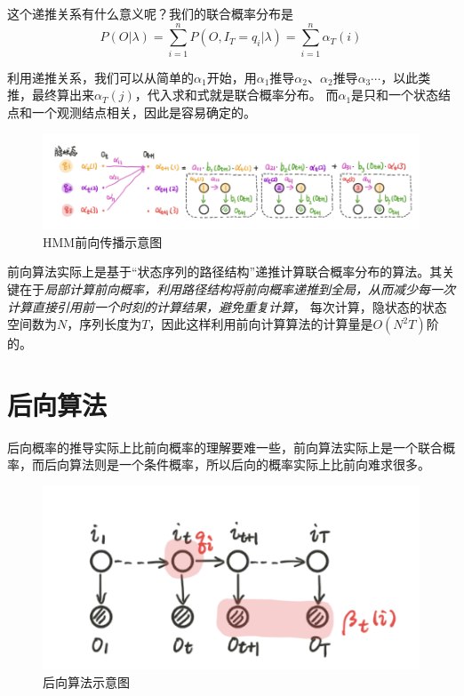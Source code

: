 这个递推关系有什么意义呢？我们的联合概率分布是
\begin{equation}
    P(O|\lambda)=\sum_{i=1}^{n} P(O,I_T=q_i|\lambda)=\sum_{i=1}^{n} \alpha_T(i)
\end{equation}

利用递推关系，我们可以从简单的$\alpha_1$开始，用$\alpha_1$推导$\alpha_2$、$\alpha_2$推导$\alpha_3\cdots$，以此类推，最终算出来$\alpha_T(j)$，代入求和式就是联合概率分布。
而$\alpha_1$是只和一个状态结点和一个观测结点相关，因此是容易确定的。
\begin{figure}[H]
    \centering
    \includegraphics[scale=0.5]{figures/HMM前向传播示意图.png}
    \caption{HMM前向传播示意图}
\end{figure}

前向算法实际上是基于“状态序列的路径结构”递推计算联合概率分布的算法。其关键在于\textsl{局部计算前向概率，利用路径结构将前向概率递推到全局，从而减少每一次计算直接引用前一个时刻的计算结果，避免重复计算}，
每次计算，隐状态的状态空间数为$N$，序列长度为$T$，因此这样利用前向计算算法的计算量是$O(N^2T)$阶的。


\section{后向算法}

后向概率的推导实际上比前向概率的理解要难一些，前向算法实际上是一个联合概率，而后向算法则是一个条件概率，所以后向的概率实际上比前向难求很多。

\begin{figure}[H]
    \centering
    \includegraphics[scale=0.5]{figures/后向算法示意图2.png}
    \caption{后向算法示意图}
\end{figure}

